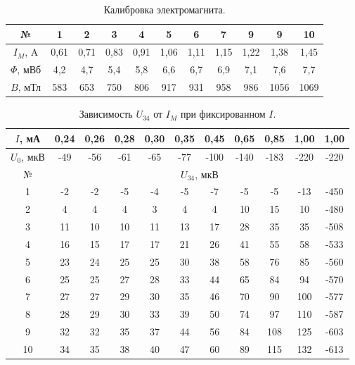 \documentclass[a4paper,12pt]{article} %
\begin{document}
	\begin{table}[H]
		\caption{Калибровка электромагнита.}
		\label{table:calibration}
		\begin{tabular}{|c|c|c|c|c|c|c|c|c|c|c|}
			\hline
			№           & 1    & 2    & 3    & 4    & 5    & 6    & 7    & 9    & 9    & 10   \\ \hline
			$I_M$, A    & 0,61 & 0,71 & 0,83 & 0,91 & 1,06 & 1,11 & 1,15 & 1,22 & 1,38 & 1,45 \\ \hline
			$\Phi$, мВб & 4,2  & 4,7  & 5,4  & 5,8  & 6,6  & 6,7  & 6,9  & 7,1  & 7,6  & 7,7  \\ \hline
			$B$, мТл    & 583  & 653  & 750  & 806  & 917  & 931  & 958  & 986  & 1056 & 1069 \\ \hline
		\end{tabular}
	\end{table}


	\begin{table}[H]
		\caption{Зависимость $U_{34}$ от $I_M$ при фиксированном $I$.}
		\label{table:U_34}
		\begin{tabular}{|c|c|c|c|c|c|c|c|c|c|c|}
			\hline
			$I$, мА    & 0,24 & 0,26 & 0,28 & 0,30 & 0,35 & 0,45 & 0,65 & 0,85 & 1,00 & 1,00 \\ \hline
			$U_0$, мкВ & -49  & -56  & -61  & -65  & -77  & -100 & -140 & -183 & -220 & -220 \\ \hline
			№          & \multicolumn{10}{c|}{$U_{34}$, мкВ}                                 \\ \hline
			1          & -2   & -2   & -5   & -4   & -5   & -7   & -5   & -5   & -13  & -450 \\ \hline
			2          & 4    & 4    & 4    & 3    & 4    & 4    & 10   & 15   & 10   & -480 \\ \hline
			3          & 11   & 10   & 10   & 11   & 13   & 17   & 28   & 35   & 35   & -508 \\ \hline
			4          & 16   & 15   & 17   & 17   & 21   & 26   & 41   & 55   & 58   & -533 \\ \hline
			5          & 23   & 24   & 25   & 25   & 30   & 38   & 58   & 76   & 85   & -560 \\ \hline
			6          & 25   & 25   & 27   & 28   & 33   & 44   & 65   & 84   & 94   & -570 \\ \hline
			7          & 27   & 27   & 29   & 30   & 35   & 46   & 70   & 90   & 100  & -577 \\ \hline
			8          & 28   & 29   & 30   & 33   & 39   & 50   & 74   & 97   & 110  & -587 \\ \hline
			9          & 32   & 32   & 35   & 37   & 44   & 56   & 84   & 108  & 125  & -603 \\ \hline
			10         & 34   & 35   & 38   & 40   & 47   & 60   & 89   & 115  & 132  & -613 \\ \hline
		\end{tabular}
	\end{table}
\end{document}
